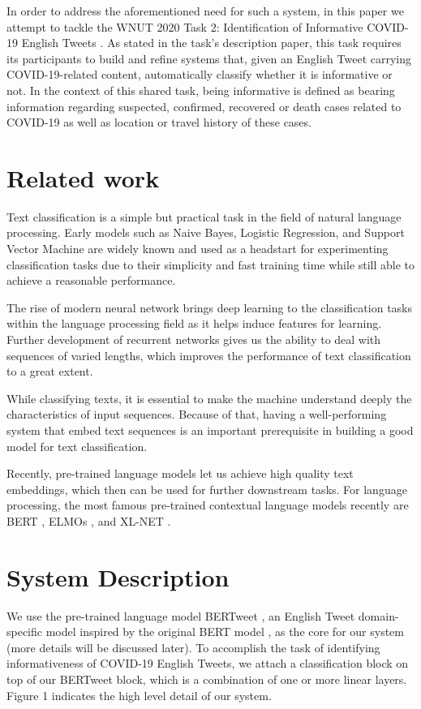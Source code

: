 \documentclass[11pt,a4paper]{article}
\begin{document}
In order to address the aforementioned need for such a system, in this paper we attempt to tackle the WNUT 2020 Task 2: Identification of Informative COVID-19 English Tweets \cite{covid19tweet}. As stated in the task's description paper, this task requires its participants to build and refine systems that, given an English Tweet carrying COVID-19-related content, automatically classify whether it is informative or not. In the context of this shared task, being informative is defined as bearing information regarding suspected, confirmed, recovered or death cases related to COVID-19 as well as location or travel history of these cases. 

\section{Related work}

Text classification is a simple but practical task in the field of natural language processing. Early models such as Naive Bayes, Logistic Regression, and Support Vector Machine are widely known and used as a headstart for experimenting classification tasks due to their simplicity and fast training time while still able to achieve a reasonable performance.

The rise of modern neural network brings deep learning to the classification tasks within the language processing field as it helps induce features for learning. Further development of recurrent networks gives us the ability to deal with sequences of varied lengths, which improves the performance of text classification to a great extent.

While classifying texts, it is essential to make the machine understand deeply the characteristics of input sequences. Because of that, having a well-performing system that embed text sequences is an important prerequisite in building a good model for text classification.

Recently, pre-trained language models let us achieve high quality text embeddings, which then can be used for further downstream tasks. For language processing, the most famous pre-trained contextual language models recently are BERT \cite{1810.04805}, ELMOs \cite{1802.05365}, and XL-NET \cite{1906.08237}.

\section{System Description}

We use the pre-trained language model BERTweet \cite{BERTweet}, an English Tweet domain-specific model inspired by the original BERT model \cite{1810.04805}, as the core for our system (more details will be discussed later). To accomplish the task of identifying informativeness of COVID-19 English Tweets, we attach a classification block on top of our BERTweet block, which is a combination of one or more linear layers. Figure 1 indicates the high level detail of our system.
\end{document}
